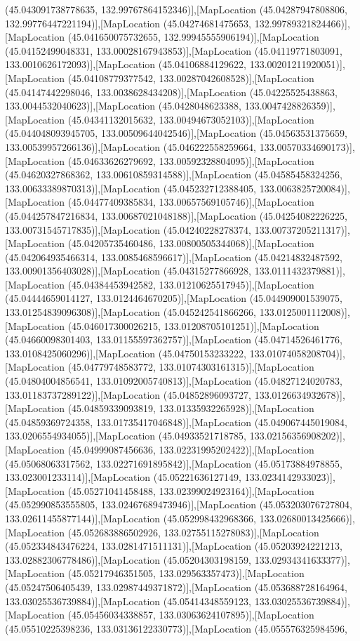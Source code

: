 (45.043091738778635, 132.99767864152346)],[MapLocation (45.04287947808806, 132.99776447221194)],[MapLocation (45.04274681475653, 132.99789321824466)],[MapLocation (45.041650075732655, 132.99945555906194)],[MapLocation (45.04152499048331, 133.00028167943853)],[MapLocation (45.04119771803091, 133.0010626172093)],[MapLocation (45.04106884129622, 133.00201211920051)],[MapLocation (45.04108779377542, 133.00287042608528)],[MapLocation (45.04147442298046, 133.0038628434208)],[MapLocation (45.04225525438863, 133.0044532040623)],[MapLocation (45.0428048623388, 133.0047428826359)],[MapLocation (45.04341132015632, 133.00494673052103)],[MapLocation (45.044048093945705, 133.00509644042546)],[MapLocation (45.04563531375659, 133.00539957266136)],[MapLocation (45.046222558259664, 133.00570334690173)],[MapLocation (45.04633626279692, 133.00592328804095)],[MapLocation (45.04620327868362, 133.00610859314588)],[MapLocation (45.04585458324256, 133.00633389870313)],[MapLocation (45.045232712388405, 133.0063825720084)],[MapLocation (45.04477409385834, 133.00657569105746)],[MapLocation (45.044257847216834, 133.00687021048188)],[MapLocation (45.04254082226225, 133.00731545717835)],[MapLocation (45.04240228278374, 133.00737205211317)],[MapLocation (45.04205735460486, 133.00800505344068)],[MapLocation (45.042064935466314, 133.0085468596617)],[MapLocation (45.04214832487592, 133.00901356403028)],[MapLocation (45.04315277866928, 133.0111432379881)],[MapLocation (45.04384453942582, 133.01210625517945)],[MapLocation (45.04444659014127, 133.0124464670205)],[MapLocation (45.044909001539075, 133.01254839096308)],[MapLocation (45.045242541866266, 133.0125001112008)],[MapLocation (45.046017300026215, 133.01208705101251)],[MapLocation (45.04660098301403, 133.01155597362757)],[MapLocation (45.04714526461776, 133.0108425060296)],[MapLocation (45.04750153233222, 133.01074058208704)],[MapLocation (45.04779748583772, 133.01074303161315)],[MapLocation (45.04804004856541, 133.01092005740813)],[MapLocation (45.04827124020783, 133.01183737289122)],[MapLocation (45.04852896093727, 133.0126634932678)],[MapLocation (45.04859339093819, 133.01335932265928)],[MapLocation (45.04859369724358, 133.01735417046848)],[MapLocation (45.049067445019084, 133.0206554934055)],[MapLocation (45.04933521718785, 133.02156356908202)],[MapLocation (45.04999087456636, 133.02231995202422)],[MapLocation (45.05068063317562, 133.02271691895842)],[MapLocation (45.05173884978855, 133.023001233114)],[MapLocation (45.05221636127149, 133.0234142933023)],[MapLocation (45.05271041458488, 133.02399024923164)],[MapLocation (45.052990853555805, 133.02467689473946)],[MapLocation (45.053203076727804, 133.02611455877144)],[MapLocation (45.052998432968366, 133.02680013425666)],[MapLocation (45.052683886502926, 133.02755115278083)],[MapLocation (45.052334843476224, 133.0281471511131)],[MapLocation (45.05203924221213, 133.02882306778486)],[MapLocation (45.05204303198159, 133.02934341633377)],[MapLocation (45.05217946351505, 133.029563357473)],[MapLocation (45.05247506405439, 133.02987449371872)],[MapLocation (45.053688728164964, 133.03025536739884)],[MapLocation (45.05414348559123, 133.03025536739884)],[MapLocation (45.05456034338857, 133.03063624107895)],[MapLocation (45.05510225398236, 133.03136122330773)],[MapLocation (45.055576325984596, 